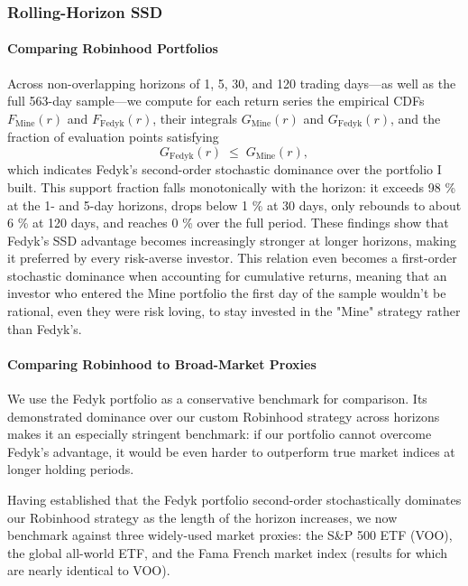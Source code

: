 \subsubsection{Rolling-Horizon SSD}
\paragraph{Comparing Robinhood Portfolios}
Across non-overlapping horizons of 1, 5, 30, and 120 trading days—as well as the full 563-day sample—we compute for each return series the empirical CDFs $F_{\mathrm{Mine}}(r)$ and $F_{\mathrm{Fedyk}}(r)$, their integrals $G_{\mathrm{Mine}}(r)$ and $G_{\mathrm{Fedyk}}(r)$, and the fraction of evaluation points satisfying  
\begin{equation}
    G_{\mathrm{Fedyk}}(r)\;\le\;G_{\mathrm{Mine}}(r),
\end{equation}
which indicates Fedyk's second-order stochastic dominance over the portfolio I built.  
This support fraction falls monotonically with the horizon: it exceeds 98 \% at the 1- and 5-day horizons, drops below 1 \% at 30 days, only rebounds to about 6 \% at 120 days, and reaches 0 \% over the full period.  
These findings show that Fedyk's SSD advantage becomes increasingly stronger at longer horizons, making it preferred by every risk-averse investor.
This relation even becomes a first-order stochastic dominance when accounting for cumulative returns, meaning that an investor who entered the Mine portfolio the first day of the sample wouldn't be rational,
even they were risk loving, to stay invested in the "Mine" strategy rather than Fedyk's.


\paragraph{Comparing Robinhood to Broad-Market Proxies}  
We use the Fedyk portfolio as a conservative benchmark for comparison. 
Its demonstrated dominance over our custom Robinhood strategy across horizons makes it an especially stringent benchmark: 
if our portfolio cannot overcome Fedyk's advantage, it would be even harder to outperform true market indices at longer holding periods.

Having established that the Fedyk portfolio second-order stochastically dominates our Robinhood strategy as the length of the horizon increases, 
we now benchmark against three widely-used market proxies: the S\&P 500 ETF (VOO), the global all-world ETF, and the Fama French market index (results for which are nearly identical to VOO).

